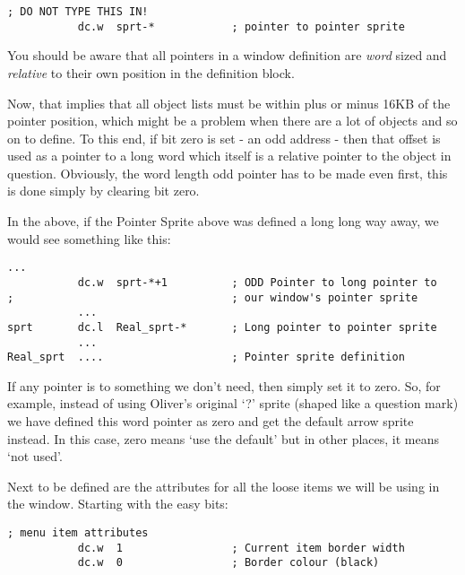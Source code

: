 \begin{lstlisting}[firstnumber=1,caption={Do Not Type This In!}]
           ; DO NOT TYPE THIS IN!
           dc.w  sprt-*            ; pointer to pointer sprite
\end{lstlisting}

You should be aware that all pointers in a window definition are
 \emph{word} sized and \emph{relative} to their
    own position in the definition block.

Now, that implies that all object lists must be within plus or minus
    16KB of the pointer position, which might be a problem when there are a
    lot of objects and so on to define. To this end, if bit zero is set -{} an
    odd address -{} then that offset is used as a pointer to a long word which
    itself is a relative pointer to the object in question. Obviously, the
    word length odd pointer has to be made even first, this is done
    simply by clearing bit zero.

In the above, if the Pointer Sprite above was defined a long long
    way away, we would see something like this:

\begin{lstlisting}[firstnumber=1,caption={Do Not Type This In Either!}]
...
           dc.w  sprt-*+1          ; ODD Pointer to long pointer to
;                                  ; our window's pointer sprite
           ...
sprt       dc.l  Real_sprt-*       ; Long pointer to pointer sprite
           ...
Real_sprt  ....                    ; Pointer sprite definition
\end{lstlisting}

If any pointer is to something we don't need, then simply set it to
    zero. So, for example, instead of using Oliver's original `?' sprite
    (shaped like a question mark) we have defined this word pointer as zero
    and get the default arrow sprite instead. In this case, zero means `use
    the default' but in other places, it means `not used'.

Next to be defined are the attributes for all the loose items we
    will be using in the window. Starting with the easy bits:

\begin{lstlisting}[firstnumber=14,caption={Main Window - Current Loose Item - Border Attributes} ]
; menu item attributes
           dc.w  1                 ; Current item border width  
           dc.w  0                 ; Border colour (black)
\end{lstlisting}

